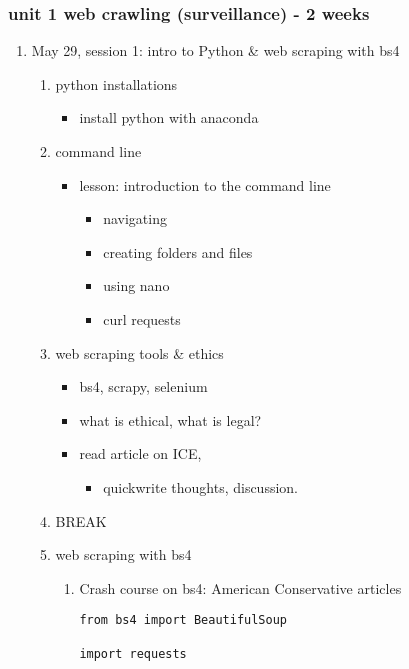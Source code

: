 \documentclass[11pt]{article}
\begin{document}
\subsubsection{unit 1 web crawling (surveillance) - 2 weeks}
\label{sec:org0e01730}
\begin{enumerate}
\item May 29, session 1: intro to Python \& web scraping with bs4
\label{sec:orgdfc4d0b}
\begin{enumerate}
\item python installations
\label{sec:org3a856a0}
\begin{itemize}
\item install python with anaconda
\end{itemize}
\item command line
\label{sec:org712c89e}
\begin{itemize}
\item lesson: introduction to the command line
\begin{itemize}
\item navigating
\item creating folders and files
\item using nano
\item curl requests
\end{itemize}
\end{itemize}
\item web scraping tools \& ethics
\label{sec:org730f599}
\begin{itemize}
\item bs4, scrapy, selenium
\item what is ethical, what is legal?
\item read article on ICE,
\begin{itemize}
\item quickwrite thoughts, discussion.
\end{itemize}
\end{itemize}
\item BREAK
\label{sec:org4417131}
\item web scraping with bs4
\label{sec:org7312f47}

\begin{enumerate}
\item Crash course on bs4: American Conservative articles
\label{sec:org85f5f21}

\begin{verbatim}
from bs4 import BeautifulSoup

import requests


\end{verbatim}
\end{enumerate}
\end{enumerate}
\end{enumerate}
\end{document}
